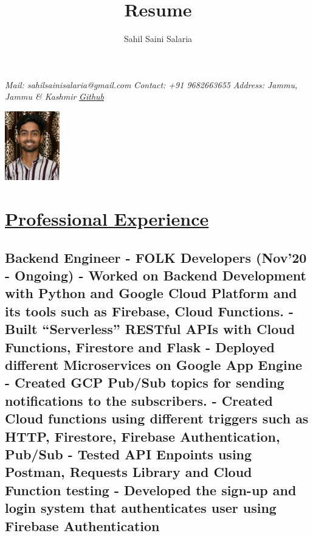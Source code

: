 \documentclass{article}
\makeatletter
\renewcommand{\maketitle}{
    \begin{flushleft}        
        {\huge\rmfamily
        \theauthor}\newline
        \vspace{0.1em}
        \textit{Mail: sahilsainisalaria@gmail.com }  \newline  
        \textit{ Contact: +91 9682663655 }  \newline 
        \textit{ Address: Jammu, Jammu \& Kashmir }  \newline 
        \textit{ \href{https://github.com/sahil1515}{Github}}  \newline 
    \end{flushleft}
}
\makeatother
\begin{document}
\begin{multicols}{2}
    \title{Resume}
    \author{Sahil Saini Salaria}
    \maketitle

    \begin{flushright}
        \includegraphics[height=3cm]{../images/Sahil.jpeg}
    \end{flushright}

\end{multicols}


\section{\underline{Professional Experience}}

\subsection{\textbf{Backend Engineer}
    \textmd{- FOLK Developers (Nov'20 - Ongoing)}\newline
    \textmd{- Worked on Backend Development with Python and Google Cloud Platform and its tools such as Firebase, Cloud Functions. }\newline
    \textmd{- Built “Serverless” RESTful APIs with Cloud Functions, Firestore and Flask}\newline
    \textmd{- Deployed different Microservices on Google App Engine}\newline
    \textmd{- Created GCP Pub/Sub topics for sending notifications to the subscribers.}\newline
    \textmd{- Created Cloud functions using different triggers such as HTTP, Firestore, Firebase Authentication, Pub/Sub}\newline
    \textmd{- Tested API Enpoints using Postman, Requests Library and Cloud Function testing}\newline
    \textmd{- Developed the sign-up and login system that authenticates user using Firebase Authentication}\newline
}
\end{document}
